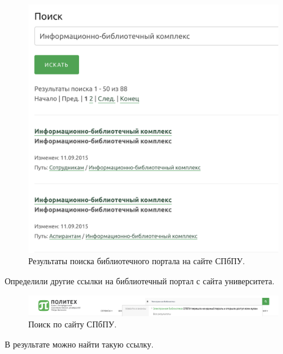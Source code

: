 \documentclass[14pt,a4paper,report]{report}
\begin{document}
\begin{figure}[h!]
\centering
\includegraphics[scale = 0.5]{112.png}
\caption{Результаты поиска библиотечного портала на сайте СПбПУ.}
\label{image:1}
\end{figure}

Определили другие ссылки на библиотечный портал с сайта университета.

\begin{figure}[h!]
\centering
\includegraphics[scale = 0.33]{113.png}
\caption{Поиск по сайту СПбПУ.}
\label{image:1}
\end{figure}

\clearpage

В результате можно найти такую ссылку.
\end{document}
